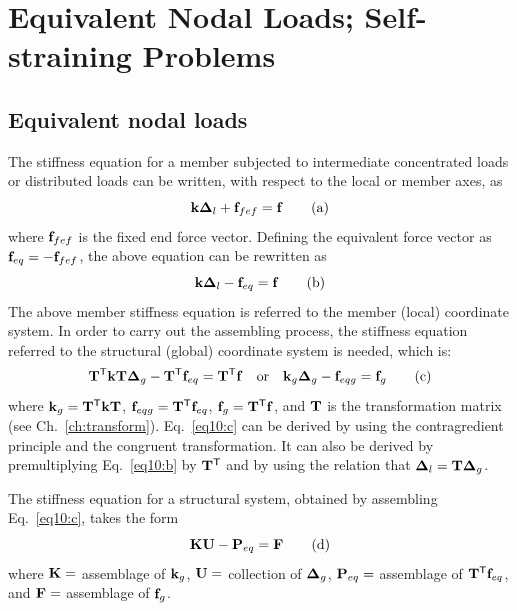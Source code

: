 \chapter[Equivalent Nodal Loads]{Equivalent Nodal Loads; Self-straining Problems}
\label{ch:eqload}

\section{Equivalent nodal loads}
The stiffness equation for a member subjected to intermediate concentrated loads or distributed loads can be written, with respect to the local or member axes, as
\begin{equation}
  \mathbf{k}\bm{\Delta}_l + \mathbf{f}_{fef} = \mathbf{f} \tag{a}\label{eq10:a}
\end{equation}
where $\mathbf{f}_{fef}$ is the fixed end force vector. Defining the equivalent force vector as $\mathbf{f}_{eq} = -\mathbf{f}_{fef}$, the above equation can be rewritten as
\begin{equation}
  \mathbf{k}\bm{\Delta}_l - \mathbf{f}_{eq} = \mathbf{f} \tag{b}\label{eq10:b}
\end{equation}
The above member stiffness equation is referred to the member (local) coordinate system. In order to carry out the assembling process, the stiffness equation referred to the structural (global) coordinate system is needed, which is:
\begin{equation}
  \mathbf{T}^{\mathsf{T}}\mathbf{k}\mathbf{T}\bm{\Delta}_g - \mathbf{T}^{\mathsf{T}}\mathbf{f}_{eq} = \mathbf{T}^{\mathsf{T}}\mathbf{f}
  \quad\text{or}\quad
  \mathbf{k}_g\bm{\Delta}_g - \mathbf{f}_{eqg} = \mathbf{f}_g \tag{c}\label{eq10:c}
\end{equation}
where $\mathbf{k}_g = \mathbf{T}^{\mathsf{T}}\mathbf{k}\mathbf{T}$, $\mathbf{f}_{eqg} = \mathbf{T}^{\mathsf{T}}\mathbf{f}_{eq}$, $\mathbf{f}_g = \mathbf{T}^{\mathsf{T}}\mathbf{f}$, and $\mathbf{T}$ is the transformation matrix (see Ch.~\ref{ch:transform}). Eq.~\eqref{eq10:c} can be derived by using the contragredient principle and the congruent transformation. It can also be derived by premultiplying Eq.~\eqref{eq10:b} by $\mathbf{T}^{\mathsf{T}}$ and by using the relation that $\bm{\Delta}_l = \mathbf{T}\bm{\Delta}_g$.

The stiffness equation for a structural system, obtained by assembling Eq.~\eqref{eq10:c}, takes the form
\begin{equation}
  \mathbf{K}\mathbf{U} - \mathbf{P}_{eq} = \mathbf{F} \tag{d}\label{eq10:d}
\end{equation}
where $\mathbf{K} =$ assemblage of $\mathbf{k}_g$, $\mathbf{U} =$ collection of $\bm{\Delta}_g$, $\mathbf{P}_{eq} =$ assemblage of $\mathbf{T}^{\mathsf{T}}\mathbf{f}_{eq}$, and $\mathbf{F} =$ assemblage of $\mathbf{f}_g$.

